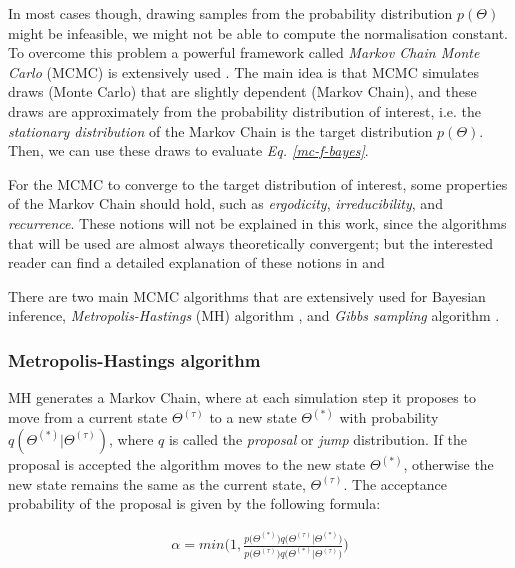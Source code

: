 In most cases though, drawing samples from the probability distribution $p(\Theta)$ might be infeasible, \eg we might not be able to compute the normalisation constant. To overcome this problem a powerful framework called \emph{Markov Chain Monte Carlo} (MCMC) is extensively used \citep{Neal1998}. The main idea is that MCMC simulates draws (\ie Monte Carlo) that are slightly dependent (\ie Markov Chain), and these draws are approximately from the probability distribution of interest, i.e. the \emph{stationary distribution} of the Markov Chain is the target distribution $p(\Theta)$. Then, we can use these draws to evaluate \emph{Eq. \ref{mc-f-bayes}}.

For the MCMC to converge to the target distribution of interest, some properties of the Markov Chain should hold, such as \emph{ergodicity}, \emph{irreducibility}, and \emph{recurrence}. These notions will not be explained in this work, since the algorithms that will be used are almost always theoretically convergent; but the interested reader can find a detailed explanation of these notions in \citet{Robert1999} and \citet{Liu2001}

There are two main MCMC algorithms that are extensively used for Bayesian inference, \emph{Metropolis-Hastings} (MH) algorithm \citep{Metropolis1953, Hastings1970}, and \emph{Gibbs sampling} algorithm \citep{Geman1984, Gelfand1990}. 

\subsubsection*{Metropolis-Hastings algorithm}
MH generates a Markov Chain, where at each simulation step it proposes to move from a current state $\Theta^{(\tau)}$ to a new state $\Theta^{(*)}$ with probability $q(\Theta^{(*)}|\Theta^{(\tau)})$, where $q$ is called the \emph{proposal} or \emph{jump} distribution. If the proposal is accepted the algorithm moves to the new state $\Theta^{(*)}$, otherwise the new state remains the same as the current state, $\Theta^{(\tau)}$. The acceptance probability of the proposal is given by the following formula:

\begin{equation} \label{MH-f-bayes}
  \begin{aligned}
	\alpha = min\bigg(1, \frac{p\big(\Theta^{(*)}\big)q\big(\Theta^{(\tau)} | \Theta^{(*)}\big)}{p\big(\Theta^{(\tau)}\big)q\big(\Theta^{(*)}|\Theta^{(\tau)}\big)}\bigg)
  \end{aligned}
\end{equation}
\vspace*{0.1mm}

